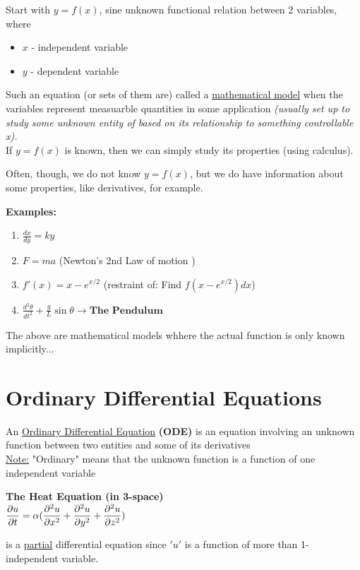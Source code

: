 
Start with $y = f(x)$, sine unknown functional relation between 2 variables, where
\begin{itemize}
	\item $x$ - independent variable
	\item $y$ - dependent variable
\end{itemize}

Such an equation (or sets of them are) called a \underline{mathematical model} when the variables represent measuarble quantities in some application \textit{(usually set up to study some unknown entity of based on its relationship to something controllable x).}\\

If $y = f(x)$ is known, then we can simply study its properties (using calculus).

Often, though, we do not know $y = f(x)$, but we do have information about some properties, like derivatives, for example.

\textbf{Examples:}
\begin{enumerate}[label=\protect\circled{\arabic*}]
	\item $\frac{dx}{dy} = ky$
	\item $F = ma$ (Newton's 2nd Law of motion )
	\item $f'(x) = x - e^{x/2}$ (restraint of: Find $f(x - e^{x/2}) d\textit{x}$)
	\item $\frac{d^2\theta}{dt^{2}} + \frac{g}{L} \sin \theta \rightarrow \textbf{The Pendulum}$
\end{enumerate}

The above are mathematical models whhere the actual function is only known implicitly...

\section*{Ordinary Differential Equations}

\begin{definition-N}
	An \underline{Ordinary Differential Equation} \textbf{(ODE)} is an equation involving an unknown function between two entities and some of its derivatives\\
\underline{Note:} "Ordinary" means that the unknown function is a function of one independent variable
\end{definition-N}

\begin{example-N}
	\textbf{The Heat Equation (in 3-space)}\\
	\center
	$\dfrac{\partial u}{\partial t} = \alpha(\dfrac{\partial^2u}{\partial x^2} + \dfrac{\partial^2 u}{\partial y^2} + \dfrac{\partial^2 u}{\partial z^2})$
	
	is a \underline{partial} differential equation since $'u'$ is a function of more than 1-independent variable.
\end{example-N}

